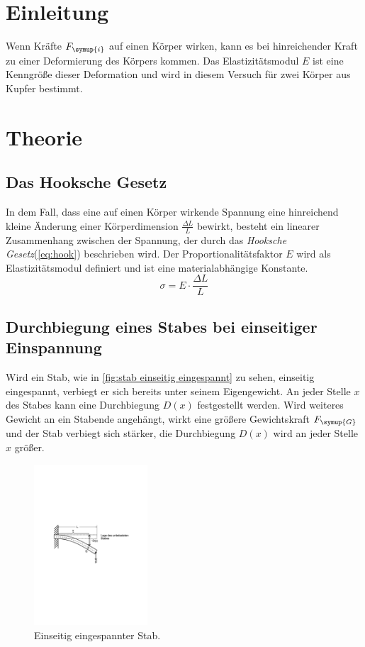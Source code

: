 \section{Einleitung}
Wenn Kräfte $F_{\symup{i}}$ auf einen Körper wirken, kann es bei hinreichender Kraft zu einer Deformierung des Körpers kommen.
Das Elastizitätsmodul $E$ ist eine Kenngröße dieser Deformation und wird in diesem Versuch für zwei Körper aus Kupfer bestimmt.

\section{Theorie}
\label{sec:Theorie}

\subsection{Das Hooksche Gesetz}
\label{sec:hook}
In dem Fall, dass eine auf einen Körper wirkende Spannung eine hinreichend kleine Änderung einer Körperdimension 
$\frac{\Delta L}{L}$ bewirkt, besteht ein linearer Zusammenhang zwischen der Spannung, der durch das 
\textit{Hooksche Gesetz}(\autoref{eq:hook}) beschrieben wird. Der Proportionalitätsfaktor $E$ wird als Elastizitätsmodul 
definiert und ist eine materialabhängige Konstante.
\begin{equation}
    \sigma = E \cdot \frac{\Delta L} {L}
    \label{eq:hook}
\end{equation}

\subsection{Durchbiegung eines Stabes bei einseitiger Einspannung}
\label{sec:einseitig}
Wird ein Stab, wie in \autoref{fig:stab einseitig eingespannt} zu sehen, einseitig eingespannt, verbiegt er sich bereits 
unter seinem Eigengewicht. An jeder Stelle $x$ des Stabes kann eine Durchbiegung $D(x)$ festgestellt werden.
Wird weiteres Gewicht an ein Stabende angehängt, wirkt eine größere Gewichtskraft $F_{\symup{G}}$ und der Stab 
verbiegt sich stärker, die Durchbiegung $D(x)$ wird an jeder Stelle $x$ größer.
\begin{figure}
    \centering
    \includegraphics[height=6cm]{content/Abbildungen/stab_einseitig_eingespannt.pdf}
    \caption{Einseitig eingespannter Stab. \cite{v103}}
    \label{fig:stab einseitig eingespannt}
\end{figure}

